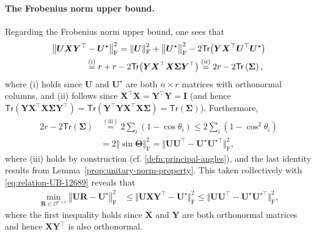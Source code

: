 \paragraph{The Frobenius norm upper bound.}
  Regarding the Frobenius norm upper bound, one sees that
%
\begin{align}
	& \big\Vert \bm{U}\bm{X}\bm{Y}^{\top}-\bm{U}^{\star}\big\Vert _{\mathrm{F}}^{2}  =\left\Vert \bm{U}\right\Vert _{\mathrm{F}}^{2}+\big\|\bm{U}^{\star}\big\|_{\mathrm{F}}^{2}-2\mathsf{Tr}\big(\bm{Y}\bm{X}^{\top}\bm{U}^{\top}\bm{U}^{\star}\big) \notag\\
 & \qquad\qquad \overset{(\mathrm{i})}{=}r+r-2\mathsf{Tr}\big(\bm{Y}\bm{X}^{\top}\bm{X}\bm{\Sigma}\bm{Y}^{\top}\big)
  \overset{(\mathrm{ii})}{=}2r-2\mathsf{Tr}\left(\bm{\Sigma}\right) ,
	\label{eq:relation-UB-12689}
\end{align}
%
where (i) holds since $\bm{U}$ and $\bm{U}^{\star}$ are both $n\times r$
matrices with orthonormal columns, and (ii) follows since $\bm{X}^{\top}\bm{X}=\bm{Y}^{\top}\bm{Y}=\bm{I}$ (and hence $\mathsf{Tr}(\bm{Y}\bm{X}^{\top}\bm{X}\bm{\Sigma}\bm{Y}^{\top})=\mathsf{Tr}(\bm{Y}^{\top}\bm{Y}\bm{X}^{\top}\bm{X}\bm{\Sigma})=\mathsf{Tr}(\bm{\Sigma})$).
Furthermore,
%
\begin{align*}
2r-2\mathsf{Tr}\left(\bm{\Sigma}\right)
	& \overset{(\mathrm{iii})}{=}2\sum\nolimits_{i} (1-\cos\theta_{i})
	\leq2\sum\nolimits_{i} (1-\cos^{2}\theta_{i})\\
 & =2\left\Vert \sin\bm{\Theta}\right\Vert _{\mathrm{F}}^{2} = \big\Vert \bm{U}\bm{U}^{\top}-{\bm{U}}^{\star}{\bm{U}}^{\star\top}\big\Vert _{\mathrm{F}}^2,
\end{align*}
%
where (iii) holds by construction (cf. \eqref{defn:principal-angles}), and the last identity results from Lemma~\ref{prop:unitary-norm-property}. This
taken collectively with  \eqref{eq:relation-UB-12689}
reveals that
%
\begin{align*}
\min_{\bm{R}\in\mathcal{O}^{r\times r}}\left\Vert \bm{U}\bm{R}-\bm{U}^{\star}\right\Vert _{\mathrm{F}}^{2}
	& \leq\big\Vert \bm{U}\bm{X}\bm{Y}^{\top}-\bm{U}^{\star}\big\Vert _{\mathrm{F}}^{2}
	\leq
	\big\Vert \bm{U}\bm{U}^{\top}-{\bm{U}}^{\star}{\bm{U}}^{\star\top}\big\Vert _{\mathrm{F}}^2  ,
\end{align*}
where the first inequality holds since $\bm{X}$ and $\bm{Y}$ are both orthonormal matrices and hence $\bm{X}\bm{Y}^{\top}$ is also orthonormal.



